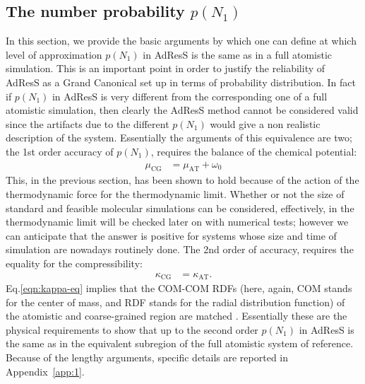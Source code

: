 \documentclass[aip,jcp,a4paper,reprint,onecolumn]{revtex4-1}
\newcommand{\AT}{{\textrm{{AT}}}}
\newcommand{\CG}{{\textrm{CG}}}
\begin{document}
\subsection{The number probability $p(N_1)$}
\label{sec:pn1}
In this section, we provide the basic arguments by which one can define at which level of approximation $p(N_{1})$
in AdResS is the same as in a full atomistic simulation. This is an important point
in order to justify the reliability of AdResS as a Grand
Canonical set up in terms of probability distribution. In fact if
$p(N_{1})$ in AdResS is very different from the corresponding one of a
full atomistic simulation, then clearly the AdResS method cannot be
considered valid since the artifacts due to the
different $p(N_{1})$ would give a non realistic description of the
system.
Essentially the arguments of this equivalence are two; the 1st order accuracy of  $p(N_{1})$, requires the balance of the chemical potential:
\begin{align}\label{eqn:mu-eq}
  \mu_{\CG} &= \mu_{\AT} + \omega_0
\end{align}
This, in the previous section, has been shown to hold because of the action of the thermodynamic force for the thermodynamic limit. 
Whether or not the size of standard and feasible molecular simulations can be considered, effectively, in the thermodynamic limit will be checked later on with numerical tests; however we can anticipate that the answer is positive for systems whose size and time of simulation are nowadays routinely done.
The 2nd order of accuracy, requires the equality for the compressibility:
\begin{align}\label{eqn:kappa-eq}
  \kappa_{\CG} &= \kappa_{\AT}.
\end{align}
Eq.\ref{eqn:kappa-eq} implies that the COM-COM RDFs (here, again, COM stands for the center of mass, and RDF stands for the radial distribution function) of the atomistic and coarse-grained region are matched \cite{han}.
Essentially these are the physical requirements to show that up to the second order $p(N_1)$ in AdResS is the same as in the equivalent subregion of the full atomistic system of reference.
Because of the lengthy arguments, specific details are reported in Appendix~\ref{app:1}.
\end{document}
